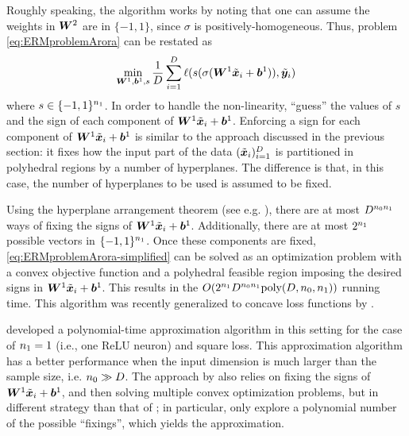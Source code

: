 Roughly speaking, the algorithm works by noting that one can assume the weights in ${\bm{W}}^2$ are in $\{-1,1\}$, since $\sigma$ is positively-homogeneous. Thus, problem \eqref{eq:ERMproblemArora} can be restated as
\begin{equation}
    \label{eq:ERMproblemArora-simplified}
    \min_{{\bm{W}}^1,{\bm{b}}^1, s} \frac{1}{D} \sum_{i=1}^D \ell (s (\sigma({\bm{W}}^1\tilde{{\bm{x}}}_i + {\bm{b}}^1)), \tilde{{\bm{y}}}_i)
\end{equation}
where $s\in \{-1,1\}^{n_1}$. In order to handle the non-linearity, \cite{arora2018understanding} ``guess'' the values of $s$ and the sign of each component of ${\bm{W}}^1\tilde{{\bm{x}}}_i + {\bm{b}}^1$. Enforcing a sign for each component of ${\bm{W}}^1\tilde{{\bm{x}}}_i + {\bm{b}}^1$ is similar to the approach discussed in the previous section: it fixes how the input part of the data $(\tilde{{\bm{x}}}_i)_{i=1}^D$ is partitioned in polyhedral regions by a number of hyperplanes. The difference is that, in this case, the number of hyperplanes to be used is assumed to be fixed.

Using the hyperplane arrangement theorem (see e.g. \cite[Proposition 6.1.1]{matousek2002lectures}), there are at most $D^{{n_0} n_1}$ ways of fixing the signs of ${\bm{W}}^1 \tilde{{\bm{x}}}_i + {\bm{b}}^1$. Additionally, there are at most $2^{n_1}$ possible vectors in $\{-1,1\}^{n_1}$. Once these components are fixed, \eqref{eq:ERMproblemArora-simplified} can be solved as an optimization problem with a convex objective function and a polyhedral feasible region imposing the desired signs in ${\bm{W}}^1\tilde{{\bm{x}}}_i + {\bm{b}}^1$. This results in the $O(2^{n_1} D^{{n_0} n_1} \text{poly}(D,{n_0},n_1))$ running time.
%
This algorithm was recently generalized to concave loss functions by \cite{froese2022computational}.

\cite{dey2020approximation} developed a polynomial-time approximation algorithm in this setting for the case of $n_1 = 1$ (i.e., one ReLU neuron) and square loss. This approximation algorithm has a better performance when the input dimension is much larger than the sample size, i.e. ${n_0} \gg D$. The approach by \cite{dey2020approximation} also relies on fixing the signs of ${\bm{W}}^1\tilde{{\bm{x}}}_i + {\bm{b}}^1$, and then solving multiple convex optimization problems, but in different strategy than that of \cite{arora2018understanding}; in particular, \cite{dey2020approximation} only explore a polynomial number of the possible ``fixings'', which yields the approximation. 
%

